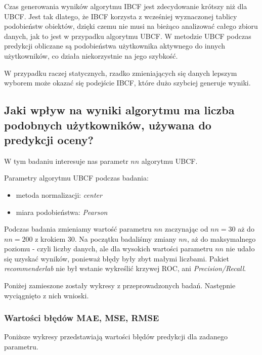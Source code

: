 \documentclass[12pt, a4paper]{article}
\begin{document}
Czas generowania wyników algorytmu IBCF jest zdecydowanie krótszy niż dla UBCF. Jest tak dlatego, że IBCF korzysta z wcześniej wyznaczonej tablicy podobieństw obiektów, dzięki czemu nie musi na bieżąco analizować całego zbioru danych, jak to jest w przypadku algorytmu UBCF. W metodzie UBCF podczas predykcji obliczane są podobieństwa użytkownika aktywnego do innych użytkowników, co działa niekorzystnie na jego szybkość.
\

W przypadku raczej statycznych, rzadko zmieniających się danych lepszym wyborem może okazać się podejście IBCF, które dużo szybciej generuje wyniki.

\subsection{Jaki wpływ na wyniki algorytmu ma liczba podobnych użytkowników, używana do predykcji oceny?}
W tym badaniu interesuje nas parametr $nn$ algorytmu UBCF. 

Parametry algorytmu UBCF podczas badania:
\begin{itemize}
\item metoda normalizacji: \emph{center}
\item miara podobieństwa: \emph{Pearson}
\end{itemize}

Podczas badania zmieniamy wartość parametru $nn$ zaczynając od $nn=30$ aż do $nn=200$ z krokiem $30$. Na początku badaliśmy zmiany $nn$, aż do maksymalnego poziomu - czyli liczby danych, ale dla wysokich wartości parametru $nn$ nie udało się uzyskać wyników, ponieważ błędy były zbyt małymi liczbami. Pakiet \emph{recommenderlab} nie był wstanie wykreślić krzywej ROC, ani \emph{Precision/Recall}.

Poniżej zamieszone zostały wykresy z przeprowadzonych badań. Następnie wyciągnięto z nich wnioski.

\subsubsection{Wartości błędów MAE, MSE, RMSE}
Poniższe wykresy przedstawiają wartości błędów predykcji dla zadanego parametru.
\end{document}
